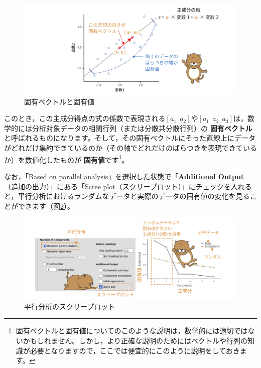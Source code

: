 \documentclass[
  12pt,
  a5jpaper,
  lualatex, ja=standard]{bxjsbook}
\renewcommand{\emph}[1]{\textbf{\color{emph} #1}}
\begin{document}
\begin{figure}[!ht]

{\centering \includegraphics[width=1\linewidth]{images/factor/pca-eigenvector} 

}

\caption{固有ベクトルと固有値}\label{fig:factor-pca-eigenvector}
\end{figure}

このとき，この主成分得点の式の係数で表現される\([{a_1\ \ a_2}]\)や\([{a_1\ \ a_2\ \ a_3}]\)は，数学的には分析対象データの相関行列（または分散共分散行列）の\emph{固有ベクトル}と呼ばれるものになります。そして，その固有ベクトルにそった直線上にデータがどれだけ集約できているのか（その軸でどれだけのばらつきを表現できているか）を数値化したものが\emph{固有値}です\footnote{固有ベクトルと固有値についてのこのような説明は，数学的には適切ではないかもしれません。しかし，より正確な説明のためにはベクトルや行列の知識が必要となりますので，ここでは便宜的にこのように説明をしておきます。}。

なお，「Based on parallel analysis」を選択した状態で「\textbf{Additional Output}（追加の出力）」にある「Scree plot（スクリープロット）」にチェックを入れると，平行分析におけるランダムなデータと実際のデータの固有値の変化を見ることができます（図\ref{fig:factor-pca-parallel}）。

\begin{figure}[!ht]

{\centering \includegraphics[width=1\linewidth]{images/factor/pca-parallel} 

}

\caption{平行分析のスクリープロット}\label{fig:factor-pca-parallel}
\end{figure}
\end{document}
